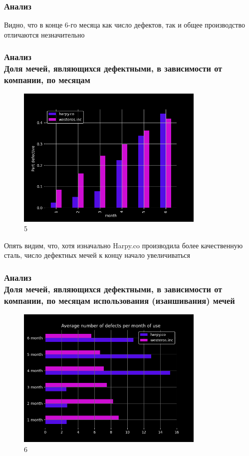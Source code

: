 \documentclass[8pt]{beamer}
\begin{document}
\begin{frame}
\frametitle{Анализ\\ {\small}}
Видно, что в конце 6-го месяца как число дефектов, так и общее производство отличаются незначительно\\

\bigskip
\end{frame}


\begin{frame}
\frametitle{Анализ\\{\small Доля мечей, являющихся дефектными, в зависимости от компании, по месяцам}}
\begin{figure}[h]
		\includegraphics[width=90mm]{prelast.png}
		\caption{5}
		\label{Fifth}
\end{figure}
\end{frame}

\begin{frame}
Опять видим, что, хотя изначально Harpy.co производила более качественную сталь, число дефектных мечей к концу начало увеличиваться\\

\bigskip

\end{frame}

\begin{frame}
\frametitle{Анализ\\{\small Доля мечей, являющихся дефектными, в зависимости от компании, по месяцам использования (изаншивания) мечей}}
\begin{figure}[h]
		\includegraphics[width=90mm]{last.png}
		\caption{6}
		\label{Sixth}
\end{figure}
\end{frame}
\end{document}

